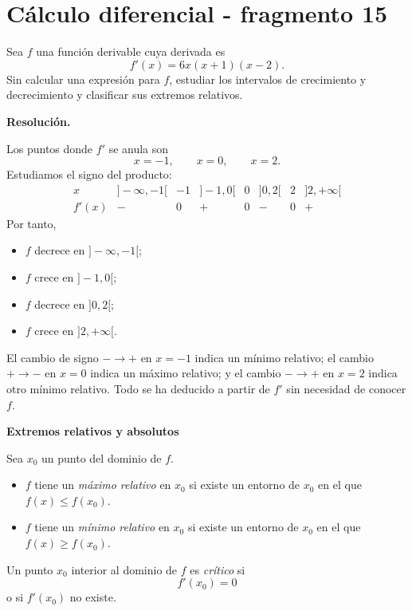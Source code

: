 \section{Cálculo diferencial - fragmento 15}
\begin{solvedexercise}
Sea $f$ una función derivable cuya derivada es
\[
f'(x)=6x(x+1)(x-2).
\]
Sin calcular una expresión para $f$, estudiar los intervalos de crecimiento y decrecimiento y clasificar sus extremos relativos.

\textbf{Resolución.}\par\smallskip
Los puntos donde $f'$ se anula son
\[
x=-1,\qquad x=0,\qquad x=2.
\]
Estudiamos el signo del producto:
\[
\begin{array}{c|ccccccc}
x & ]-\infty,-1[ & -1 & ]-1,0[ & 0 & ]0,2[ & 2 & ]2,+\infty[\\
\hline
f'(x) & - & 0 & + & 0 & - & 0 & +
\end{array}
\]
Por tanto,
\begin{itemize}
\item $f$ decrece en $]-\infty,-1[$;
\item $f$ crece en $]-1,0[$;
\item $f$ decrece en $]0,2[$;
\item $f$ crece en $]2,+\infty[$.
\end{itemize}
El cambio de signo $-\to+$ en $x=-1$ indica un mínimo relativo; el cambio $+\to-$ en $x=0$ indica un máximo relativo; y el cambio $-\to+$ en $x=2$ indica otro mínimo relativo. Todo se ha deducido a partir de $f'$ sin necesidad de conocer $f$.
\end{solvedexercise}

\textbf{Extremos relativos y absolutos}

\begin{definition}
Sea $x_0$ un punto del dominio de $f$.
\begin{itemize}
\item $f$ tiene un \emph{máximo relativo} en $x_0$ si existe un entorno de $x_0$ en el que $f(x)\leq f(x_0)$.
\item $f$ tiene un \emph{mínimo relativo} en $x_0$ si existe un entorno de $x_0$ en el que $f(x)\geq f(x_0)$.
\end{itemize}
\end{definition}

\begin{definition}
Un punto $x_0$ interior al dominio de $f$ es \emph{crítico} si
\[
f'(x_0)=0
\]
o si $f'(x_0)$ no existe.
\end{definition}


